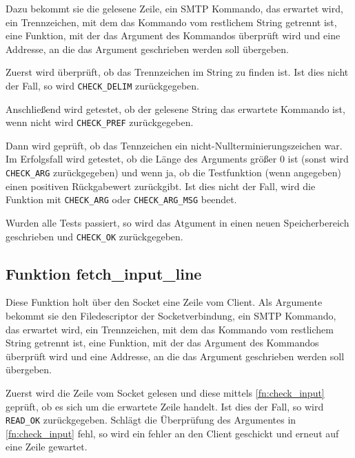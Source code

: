 \documentclass[pdftex,final,a4paper,10pt,notitlepage,halfparskip]{scrreprt}
\begin{document}
Dazu bekommt sie die gelesene Zeile, ein SMTP Kommando, das erwartet wird, ein Trennzeichen, mit dem das Kommando vom restlichem String getrennt ist, eine Funktion, mit der das Argument des Kommandos überprüft wird und eine Addresse, an die das Argument geschrieben werden soll übergeben.

Zuerst wird überprüft, ob das Trennzeichen im String zu finden ist. Ist dies nicht der Fall, so wird \texttt{CHECK\_DELIM} zurückgegeben.

Anschließend wird getestet, ob der gelesene String das erwartete Kommando ist, wenn nicht wird \texttt{CHECK\_PREF} zurückgegeben.

Dann wird geprüft, ob das Tennzeichen ein nicht-Nullterminierungszeichen war. Im Erfolgsfall wird getestet, ob die Länge des Arguments größer 0 ist (sonst wird \texttt{CHECK\_ARG} zurückgegeben) und wenn ja, ob die Testfunktion (wenn angegeben) einen positiven Rückgabewert zurückgibt. Ist dies nicht der Fall, wird die Funktion mit \texttt{CHECK\_ARG} oder \texttt{CHECK\_ARG\_MSG} beendet.

Wurden alle Tests passiert, so wird das Atgument in einen neuen Speicherbereich geschrieben und \texttt{CHECK\_OK} zurückgegeben.

\subsection{Funktion fetch\_input\_line}\label{fn:fetch_input_line}
Diese Funktion holt über den Socket eine Zeile vom Client. Als Argumente bekommt sie den Filedescriptor der Socketverbindung, ein SMTP Kommando, das erwartet wird, ein Trennzeichen, mit dem das Kommando vom restlichem String getrennt ist, eine Funktion, mit der das Argument des Kommandos überprüft wird und eine Addresse, an die das Argument geschrieben werden soll übergeben.

Zuerst wird die Zeile vom Socket gelesen und diese mittels \ref{fn:check_input} geprüft, ob es sich um die erwartete Zeile handelt. Ist dies der Fall, so wird \texttt{READ\_OK} zurückgegeben. Schlägt die Überprüfung des Argumentes in \ref{fn:check_input} fehl, so wird ein fehler an den Client geschickt und erneut auf eine Zeile gewartet.
\end{document}
